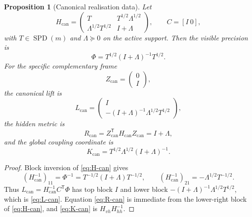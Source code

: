 \documentclass[11pt,a4paper]{article}
\numberwithin{equation}{section}
\DeclareMathOperator{\SPD}{SPD}
\theoremstyle{thmcompact}
\newtheorem{proposition}[theorem]{Proposition}
\theoremstyle{remark}
\begin{document}
\begin{proposition}[Canonical realisation data]
\label{prop:canonical-data}
Let
\begin{equation}
H_{\mathrm{can}}
=
\begin{pmatrix}
T & T^{1/2}\Lambda^{1/2}\\
\Lambda^{1/2}T^{1/2} & I+\Lambda
\end{pmatrix},
\qquad
C=[I\ 0],
\label{eq:H-can}
\end{equation}
with $T\in\SPD(m)$ and $\Lambda\succeq 0$ on the active support. Then the visible precision is
\begin{equation}
\Phi=T^{1/2}(I+\Lambda)^{-1}T^{1/2}.
\label{eq:Phi-can}
\end{equation}
For the specific complementary frame
\begin{equation}
Z_{\mathrm{can}}=
\begin{pmatrix}
0\\
I
\end{pmatrix},
\label{eq:Z-can}
\end{equation}
the canonical lift is
\begin{equation}
L_{\mathrm{can}}=
\begin{pmatrix}
I\\
-(I+\Lambda)^{-1}\Lambda^{1/2}T^{1/2}
\end{pmatrix},
\label{eq:L-can}
\end{equation}
the hidden metric is
\begin{equation}
R_{\mathrm{can}}=Z_{\mathrm{can}}^{\mathsf T}H_{\mathrm{can}}Z_{\mathrm{can}}=I+\Lambda,
\label{eq:R-can}
\end{equation}
and the global coupling coordinate is
\begin{equation}
K_{\mathrm{can}}=T^{1/2}\Lambda^{1/2}(I+\Lambda)^{-1}.
\label{eq:K-can}
\end{equation}
\end{proposition}

\begin{proof}
Block inversion of \eqref{eq:H-can} gives
\[
(H_{\mathrm{can}}^{-1})_{11}=\Phi^{-1}=T^{-1/2}(I+\Lambda)T^{-1/2},
\qquad
(H_{\mathrm{can}}^{-1})_{21}=-\Lambda^{1/2}T^{-1/2}.
\]
Thus $L_{\mathrm{can}}=H_{\mathrm{can}}^{-1}C^{\mathsf T}\Phi$ has top block $I$ and lower block $-(I+\Lambda)^{-1}\Lambda^{1/2}T^{1/2}$, which is \eqref{eq:L-can}. Equation \eqref{eq:R-can} is immediate from the lower-right block of \eqref{eq:H-can}, and \eqref{eq:K-can} is $H_{vh}H_{hh}^{-1}$.
\end{proof}
\end{document}
